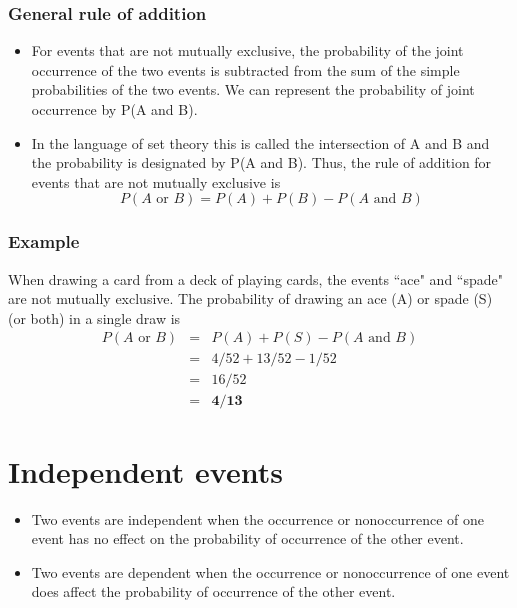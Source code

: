 \documentclass{beamer}
\begin{document}
\begin{frame}
\frametitle{General rule of addition}
\begin{itemize}
\item For events that are not mutually exclusive, the probability of the joint occurrence of the two events is
subtracted from the sum of the simple probabilities of the two events. We can represent the probability of joint
occurrence by P(A and B).\item  In the language of set theory this is called the intersection of A and B and the
probability is designated by P(A and B).  Thus, the rule of addition for events that are not mutually exclusive is
\[ P(A \mbox{ or }B) = P(A)+ P(B) - P(A \mbox{ and }B)\]
\end{itemize}
\end{frame}
\begin{frame} 
\frametitle{Example}
\Large
When drawing a card from a deck of playing cards, the events ``ace" and ``spade" are not mutually
exclusive. The probability of drawing an ace (A) or spade (S) (or both) in a single draw is
\begin{eqnarray} P(A \mbox{ or }B) &=& P(A) + P(S) - P(A \mbox{ and }B)\\ &=& 4/52 + 13/52 -1/52 \\&=& 16/52 \\
&=& \textbf{4/13} 
\end{eqnarray}
\end{frame}
\section*{Independent events}
\begin{frame}
\Large
\begin{itemize}
\item Two events are independent when the occurrence or nonoccurrence of one event has no effect on the
probability of occurrence of the other event. 

\item Two events are dependent when the occurrence or nonoccurrence
of one event does affect the probability of occurrence of the other event.
\end{itemize}

\end{frame}
\end{document}
